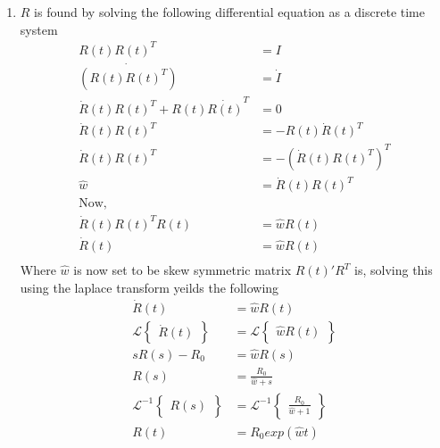 \documentclass[10pt]{article}
\begin{document}
\begin{enumerate}
\begin{enumerate}
\item $R$ is found by solving the following differential equation as a discrete time system
\begin{align*}
R(t)R(t)^T &= I \\
\dot{(R(t)R(t)^T)}&= \dot{I} \\
\dot{R}(t)R(t)^T + R(t)\dot{R(t)}^T &= 0 \\
\dot{R}(t)R(t)^T &= -R(t)\dot{R}(t)^T \\
\dot{R}(t)R(t)^T &= - (\dot{R}(t)R(t)^T)^T \\
\hat{w} &= \dot{R}(t)R(t)^T \\ \text{Now,}\\
\dot{R}(t)R(t)^TR(t) &= \hat{w}R(t) \\
\dot{R}(t) &= \hat{w}R(t) \\
\end{align*}
Where $\hat{w}$ is now set to be skew symmetric matrix $R(t)'R^T$ is, solving this using the laplace transform yeilds the following
\begin{align*}
\dot{R}(t) &= \hat{w}R(t) \\
\mathscr{L}\begin{Bmatrix} \dot{R}(t) \end{Bmatrix} &= \mathscr{L} \begin{Bmatrix} \hat{w}R(t) \end{Bmatrix} \\
sR(s) - R_0 &= \hat{w}R(s) \\
R(s) &= \frac{R_0}{\hat{w} + s} \\
\mathscr{L}^{-1} \begin{Bmatrix}R(s) \end{Bmatrix} &= \mathscr{L}^{-1} \begin{Bmatrix} \frac{R_0}{\hat{w} + 1} \end{Bmatrix} \\
R(t) &= R_0 exp(\hat{w}t)
\end{align*}


\end{enumerate}
\end{enumerate}
\end{document}
